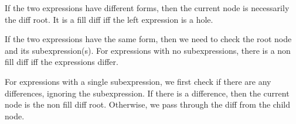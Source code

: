 If the two expressions have different forms, then the current node is necessarily the diff root. It is a fill diff iff the left expression is a hole.

\begin{singlespace}
\end{singlespace}

If the two expressions have the same form, then we need to check the root node and its subexpression(s). For expressions with no subexpressions, there is a non fill diff iff the expressions differ.

\begin{singlespace}
\end{singlespace}

For expressions with a single subexpression, we first check if there are any differences, ignoring the subexpression. If there is a difference, then the current node is the non fill diff root. Otherwise, we pass through the diff from the child node.

\begin{singlespace}
\end{singlespace}

